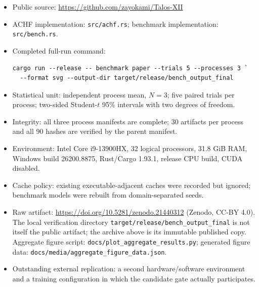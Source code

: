 \documentclass{article}
\begin{document}
\begin{itemize}[leftmargin=*]
\item Public source: \url{https://github.com/zayokami/Talos-XII}
\item ACHF implementation: \texttt{src/achf.rs}; benchmark implementation:
\texttt{src/bench.rs}.
\item Completed full-run command:
\begin{verbatim}
cargo run --release -- benchmark paper --trials 5 --processes 3 `
  --format svg --output-dir target/release/bench_output_final
\end{verbatim}
\item Statistical unit: independent process mean, $N=3$; five paired trials per
process; two-sided Student-$t$ 95\% intervals with two degrees of freedom.
\item Integrity: all three process manifests are complete; 30 artifacts per
process and all 90 hashes are verified by the parent manifest.
\item Environment: Intel Core i9-13900HX, 32 logical processors, 31.8 GiB RAM,
Windows build 26200.8875, Rust/Cargo 1.93.1, release CPU build, CUDA disabled.
\item Cache policy: existing executable-adjacent caches were recorded but
ignored; benchmark models were rebuilt from domain-separated seeds.
\item Raw artifact: \url{https://doi.org/10.5281/zenodo.21440312}
(Zenodo, CC-BY 4.0). The local verification directory
\texttt{target/release/bench\_output\_final} is not itself the public
artifact; the archive above is its immutable published copy.
Aggregate figure script: \texttt{docs/plot\_aggregate\_results.py}; generated
figure data: \texttt{docs/media/aggregate\_figure\_data.json}.
\item Outstanding external replication: a second hardware/software environment
and a training configuration in which the candidate gate actually participates.
\end{itemize}



\end{document}
